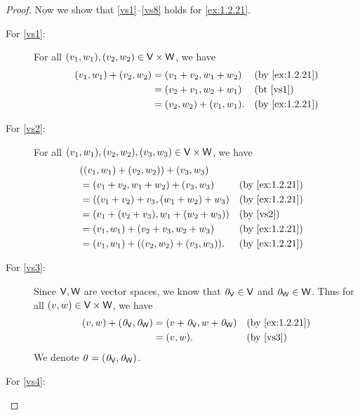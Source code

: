 \begin{proof}
	Now we show that \ref{vs1}--\ref{vs8} holds for \cref{ex:1.2.21}.
	\begin{description}
		\item[For \ref{vs1}:]
			For all \(\p{v_{1}, w_{1}}, \p{v_{2}, w_{2}} \in \V \times \W\), we have
			\begin{align*}
				\p{v_{1}, w_{1}} + \p{v_{2}, w_{2}} & = \p{v_{1} + v_{2}, w_{1} + w_{2}}     &  & \text{(by \cref{ex:1.2.21})} \\
				                                    & = \p{v_{2} + v_{1}, w_{2} + w_{1}}     &  & \text{(bt \ref{vs1})}        \\
				                                    & = \p{v_{2}, w_{2}} + \p{v_{1}, w_{1}}. &  & \text{(by \cref{ex:1.2.21})}
			\end{align*}
		\item[For \ref{vs2}:]
			For all \(\p{v_{1}, w_{1}}, \p{v_{2}, w_{2}}, \p{v_{3}, w_{3}} \in \V \times \W\), we have
			\begin{align*}
				 & \p{\p{v_{1}, w_{1}} + \p{v_{2}, w_{2}}} + \p{v_{3}, w_{3}}                                      \\
				 & = \p{v_{1} + v_{2}, w_{1} + w_{2}} + \p{v_{3}, w_{3}}         &  & \text{(by \cref{ex:1.2.21})} \\
				 & = \p{\p{v_{1} + v_{2}} + v_{3}, \p{w_{1} + w_{2}} + w_{3}}    &  & \text{(by \cref{ex:1.2.21})} \\
				 & = \p{v_{1} + \p{v_{2} + v_{3}}, w_{1} + \p{w_{2} + w_{3}}}    &  & \text{(by \ref{vs2})}        \\
				 & = \p{v_{1}, w_{1}} + \p{v_{2} + v_{3}, w_{2} + w_{3}}         &  & \text{(by \cref{ex:1.2.21})} \\
				 & = \p{v_{1}, w_{1}} + \p{\p{v_{2}, w_{2}} + \p{v_{3}, w_{3}}}. &  & \text{(by \cref{ex:1.2.21})}
			\end{align*}
		\item[For \ref{vs3}:]
			Since \(\mathsf{V}, \mathsf{W}\) are vector spaces, we know that \(\mathit{0}_{\mathsf{V}} \in \mathsf{V}\) and \(\mathit{0}_{\mathsf{W}} \in \mathsf{W}\).
			Thus for all \(\left\lparen v, w\right\rparen \in \mathsf{V} \times \mathsf{W}\), we have
			\begin{align*}
				\p{v, w} + \p{\zv_{\V}, \zv_{\W}} & = \p{v + \zv_{\V}, w + \zv_{\W}} &  & \text{(by \cref{ex:1.2.21})} \\
				                                  & = \p{v, w}.                      &  & \text{(by \ref{vs3})}
			\end{align*}
			We denote \(\mathit{0} = \left\lparen\mathit{0}_{\mathsf{V}}, \mathit{0}_{\mathsf{W}}\right\rparen\).
		\item[For \ref{vs4}:]

\end{description}
\end{proof}
